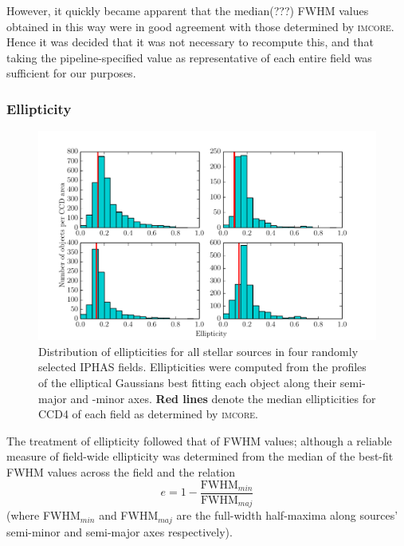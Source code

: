 \documentclass[a4paper,useAMS,usenatbib]{mn2e}
\begin{document}
However, it quickly became apparent that the median(???) FWHM values obtained in this way
were in good agreement with those determined by \textsc{imcore}.  Hence it was decided 
that it was not necessary to recompute this, and that taking the pipeline-specified value as 
representative of each entire field was sufficient for our purposes. 

\subsubsection{Ellipticity}
\label{subsubsec:ellipticity}
\begin{figure} 
\begin{center}
\includegraphics[width=1.0\linewidth]{figures/parameter_ell.pdf}
\caption{\footnotesize Distribution of ellipticities for all stellar sources in
four randomly selected IPHAS fields. Ellipticities were computed from the
profiles of the elliptical Gaussians best fitting each object along their semi-
major and -minor axes. \textbf{Red lines} denote the median ellipticities for
CCD4 of each field as determined by \textsc{imcore.}} 
\label{fig:parameter_ell}
\end{center} 
\end{figure}

The treatment of ellipticity followed that of FWHM values; although a reliable measure of field-wide ellipticity was 
determined from the median of the best-fit FWHM values across the field and the relation
\begin{equation}
e=1-\frac{\mathrm{FWHM}_{min}}{\mathrm{FWHM}_{maj}}
\label{eq:ellipticity}
\end{equation}
\noindent (where FWHM$_{min}$ and FWHM$_{maj}$ are the full-width half-maxima along sources' semi-minor and semi-major 
axes respectively).
\end{document}
